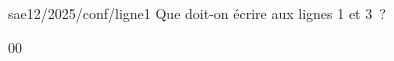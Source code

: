 \begin{question}{sae12/2025/conf/ligne1}
  Que doit-on écrire aux lignes 1 et 3~?
  \begin{reponses}{0}{0}
  \end{reponses}
\end{question}
